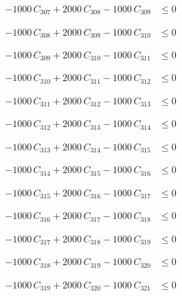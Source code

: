 \documentclass[a4paper,11pt]{article}
\begin{document}
\begin{align}
-1000\,C_{307} + 2000\,C_{308} - 1000\,C_{309} &\leq 0 \nonumber
\end{align}

\begin{align}
-1000\,C_{308} + 2000\,C_{309} - 1000\,C_{310} &\leq 0 \nonumber
\end{align}

\begin{align}
-1000\,C_{309} + 2000\,C_{310} - 1000\,C_{311} &\leq 0 \nonumber
\end{align}

\begin{align}
-1000\,C_{310} + 2000\,C_{311} - 1000\,C_{312} &\leq 0 \nonumber
\end{align}

\begin{align}
-1000\,C_{311} + 2000\,C_{312} - 1000\,C_{313} &\leq 0 \nonumber
\end{align}

\begin{align}
-1000\,C_{312} + 2000\,C_{313} - 1000\,C_{314} &\leq 0 \nonumber
\end{align}

\begin{align}
-1000\,C_{313} + 2000\,C_{314} - 1000\,C_{315} &\leq 0 \nonumber
\end{align}

\begin{align}
-1000\,C_{314} + 2000\,C_{315} - 1000\,C_{316} &\leq 0 \nonumber
\end{align}

\begin{align}
-1000\,C_{315} + 2000\,C_{316} - 1000\,C_{317} &\leq 0 \nonumber
\end{align}

\begin{align}
-1000\,C_{316} + 2000\,C_{317} - 1000\,C_{318} &\leq 0 \nonumber
\end{align}

\begin{align}
-1000\,C_{317} + 2000\,C_{318} - 1000\,C_{319} &\leq 0 \nonumber
\end{align}

\begin{align}
-1000\,C_{318} + 2000\,C_{319} - 1000\,C_{320} &\leq 0 \nonumber
\end{align}

\begin{align}
-1000\,C_{319} + 2000\,C_{320} - 1000\,C_{321} &\leq 0 \nonumber
\end{align}
\end{document}
